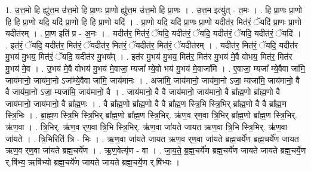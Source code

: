 \documentclass[17pt]{extarticle}
\begin{document}
1. उ॒त्त॒मो हि ह्यु॑त्त॒म उ॑त्त॒मो हि प्रा॒णः प्रा॒णो ह्यु॑त्त॒म उ॑त्त॒मो हि प्रा॒णः । . उ॒त्त॒म इत्यु॑त् - त॒मः । . हि प्रा॒णः प्रा॒णो हि हि प्रा॒णो यदि॒ यदि॑ प्रा॒णो हि हि प्रा॒णो यदि॑ । . प्रा॒णो यदि॒ यदि॑ प्रा॒णः प्रा॒णो यदीत॑र॒ मित॑रं॒ ॅयदि॑ प्रा॒णः प्रा॒णो यदीत॑रम् । . प्रा॒ण इति॑ प्र - अ॒नः । . यदीत॑र॒ मित॑रं॒ ॅयदि॒ यदीत॑रं॒ ॅयदि॒ यदीत॑रं॒ ॅयदि॒ यदीत॑रं॒ ॅयदि॑ । . इत॑रं॒ ॅयदि॒ यदीत॑र॒ मित॑रं॒ ॅयदीत॑र॒ मित॑रं॒ ॅयदीत॑र॒ मित॑रं॒ ॅयदीत॑रम् । . यदीत॑र॒ मित॑रं॒ ॅयदि॒ यदीत॑र मु॒भय॑ मु॒भय॒ मित॑रं॒ ॅयदि॒ यदीत॑र मु॒भय᳚म् । . इत॑र मु॒भय॑ मु॒भय॒ मित॑र॒ मित॑र मु॒भय॑ मे॒वै वोभय॒ मित॑र॒ मित॑र मु॒भय॑ मे॒व । . उ॒भय॑ मे॒वै वोभय॑ मु॒भय॑ मे॒वाजा॒ म्यजा᳚ म्ये॒वो भय॑ मु॒भय॑ मे॒वाजा॑मि । . ए॒वाजा॒ म्यजा᳚ म्ये॒वैवा जा॑मि॒ जाय॑मानो॒ जाय॑मा॒नो ऽजा᳚म्ये॒वैवा जा॑मि॒ जाय॑मानः । . अजा॑मि॒ जाय॑मानो॒ जाय॑मा॒नो ऽजा॒ म्यजा॑मि॒ जाय॑मानो॒ वै वै जाय॑मा॒नो ऽजा॒ म्यजा॑मि॒ जाय॑मानो॒ वै । . जाय॑मानो॒ वै वै जाय॑मानो॒ जाय॑मानो॒ वै ब्रा᳚ह्म॒णो ब्रा᳚ह्म॒णो वै जाय॑मानो॒ जाय॑मानो॒ वै ब्रा᳚ह्म॒णः । . वै ब्रा᳚ह्म॒णो ब्रा᳚ह्म॒णो वै वै ब्रा᳚ह्म॒ण स्त्रि॒भि स्त्रि॒भिर् ब्रा᳚ह्म॒णो वै वै ब्रा᳚ह्म॒ण स्त्रि॒भिः । . ब्रा॒ह्म॒ण स्त्रि॒भि स्त्रि॒भिर् ब्रा᳚ह्म॒णो ब्रा᳚ह्म॒ण स्त्रि॒भिर्. ऋ॑ण॒व र्‌ण॒वा त्रि॒भिर् ब्रा᳚ह्म॒णो ब्रा᳚ह्म॒ण स्त्रि॒भिर्. ऋ॑ण॒वा । . त्रि॒भिर्. ऋ॑ण॒व र्‌ण॒वा त्रि॒भि स्त्रि॒भिर्. ऋ॑ण॒वा जा॑यते जायत ऋण॒वा त्रि॒भि स्त्रि॒भिर्. ऋ॑ण॒वा जा॑यते । . त्रि॒भिरिति॑ त्रि - भिः । . ऋ॒ण॒वा जा॑यते जायत ऋण॒व र्‌ण॒वा जा॑यते ब्रह्म॒चर्ये॑ण ब्रह्म॒चर्ये॑ण जायत ऋण॒व र्‌ण॒वा जा॑यते ब्रह्म॒चर्ये॑ण । . ऋ॒ण॒वेत्यृ॑ण - वा । . जा॒य॒ते॒ ब्र॒ह्म॒चर्ये॑ण ब्रह्म॒चर्ये॑ण जायते जायते ब्रह्म॒चर्ये॒ण र्.षि॑भ्य॒ ऋषि॑भ्यो ब्रह्म॒चर्ये॑ण जायते जायते ब्रह्म॒चर्ये॒ण र्.षि॑भ्यः । \newline
\end{document}
